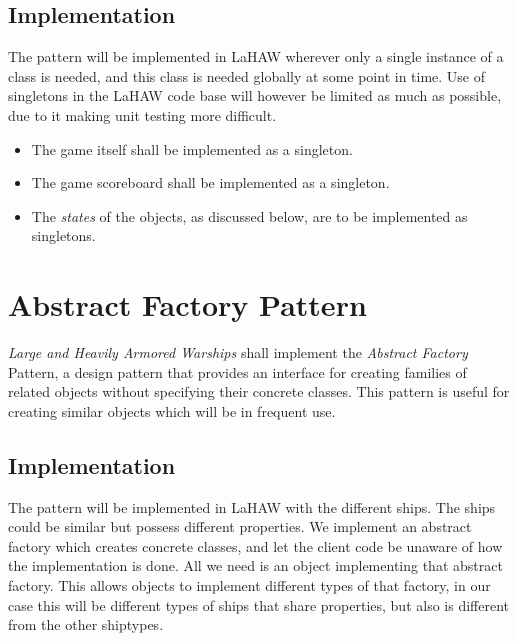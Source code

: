         \subsection{Implementation}
        The pattern will be implemented in LaHAW wherever only a single instance of a class is needed, and this class is needed globally at some point in time. Use of singletons in the LaHAW code base will however be limited as much as possible, due to it making unit testing more difficult\cite{singleton_unit_testing}.
    
        \begin{itemize}
            \item The game itself shall be implemented as a singleton.
            \item The game scoreboard shall be implemented as a singleton.
            \item The \emph{states} of the objects, as discussed below, are to be implemented as singletons.
        \end{itemize}
    
    

\section{Abstract Factory Pattern}
\emph{Large and Heavily Armored Warships} shall implement the \emph{Abstract Factory} Pattern, a design pattern that provides an interface for creating families of related objects without specifying their concrete classes\cite{abstractfactory}. This pattern is useful for creating similar objects which will be in frequent use.


    \subsection{Implementation}
    The pattern will be implemented in LaHAW with the different ships. The ships could be similar but possess different properties. We implement an abstract factory which creates concrete classes, and let the client code be unaware of how the implementation is done. All we need is an object implementing that abstract factory. This allows objects to implement different types of that factory, in our case this will be different types of ships that share properties, but also is different from the other shiptypes.


